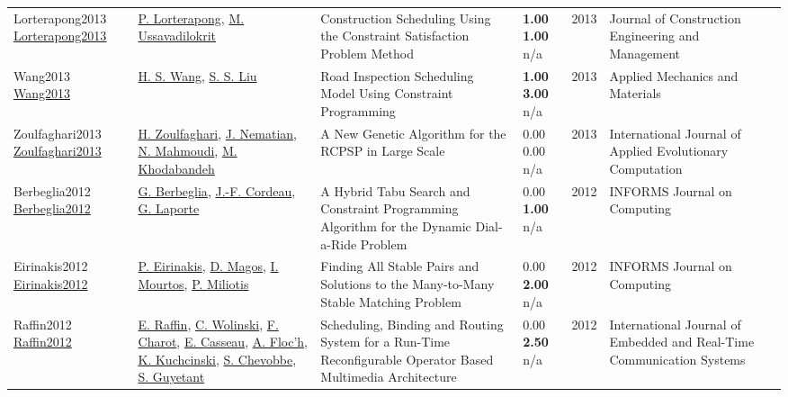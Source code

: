 {\begin{longtable}{p{3cm}p{5cm}p{10cm}p{1cm}rp{2.5cm}l}
Lorterapong2013 \href{http://dx.doi.org/10.1061/(asce)co.1943-7862.0000582}{Lorterapong2013} & \hyperref[auth:a1789]{P. Lorterapong}, \hyperref[auth:a1790]{M. Ussavadilokrit} & Construction Scheduling Using the Constraint Satisfaction Problem Method & \noindent{}\textbf{1.00} \textbf{1.00} n/a & 2013 & Journal of Construction Engineering and Management & \cite{Lorterapong2013}\\
Wang2013 \href{http://dx.doi.org/10.4028/www.scientific.net/amm.357-360.2720}{Wang2013} & \hyperref[auth:a1900]{H. S. Wang}, \hyperref[auth:a1901]{S. S. Liu} & Road Inspection Scheduling Model Using Constraint Programming & \noindent{}\textbf{1.00} \textbf{3.00} n/a & 2013 & Applied Mechanics and Materials & \cite{Wang2013}\\
Zoulfaghari2013 \href{http://dx.doi.org/10.4018/jaec.2013040103}{Zoulfaghari2013} & \hyperref[auth:a1755]{H. Zoulfaghari}, \hyperref[auth:a1756]{J. Nematian}, \hyperref[auth:a1757]{N. Mahmoudi}, \hyperref[auth:a1758]{M. Khodabandeh} & A New Genetic Algorithm for the RCPSP in Large Scale & \noindent{}\textcolor{black!50}{0.00} \textcolor{black!50}{0.00} n/a & 2013 & International Journal of Applied Evolutionary Computation & \cite{Zoulfaghari2013}\\
Berbeglia2012 \href{http://dx.doi.org/10.1287/ijoc.1110.0454}{Berbeglia2012} & \hyperref[auth:a1844]{G. Berbeglia}, \hyperref[auth:a1845]{J.-F. Cordeau}, \hyperref[auth:a1073]{G. Laporte} & A Hybrid Tabu Search and Constraint Programming Algorithm for the Dynamic Dial-a-Ride Problem & \noindent{}\textcolor{black!50}{0.00} \textbf{1.00} n/a & 2012 & \cellcolor{red!20}INFORMS Journal on Computing & \cite{Berbeglia2012}\\
Eirinakis2012 \href{http://dx.doi.org/10.1287/ijoc.1110.0449}{Eirinakis2012} & \hyperref[auth:a1913]{P. Eirinakis}, \hyperref[auth:a1914]{D. Magos}, \hyperref[auth:a1915]{I. Mourtos}, \hyperref[auth:a1916]{P. Miliotis} & Finding All Stable Pairs and Solutions to the Many-to-Many Stable Matching Problem & \noindent{}\textcolor{black!50}{0.00} \textbf{2.00} n/a & 2012 & \cellcolor{red!20}INFORMS Journal on Computing & \cite{Eirinakis2012}\\
Raffin2012 \href{http://dx.doi.org/10.4018/jertcs.2012010101}{Raffin2012} & \hyperref[auth:a1529]{E. Raffin}, \hyperref[auth:a658]{C. Wolinski}, \hyperref[auth:a1530]{F. Charot}, \hyperref[auth:a1531]{E. Casseau}, \hyperref[auth:a1532]{A. Floc’h}, \hyperref[auth:a659]{K. Kuchcinski}, \hyperref[auth:a1533]{S. Chevobbe}, \hyperref[auth:a1534]{S. Guyetant} & \cellcolor{green!10}Scheduling, Binding and Routing System for a Run-Time Reconfigurable Operator Based Multimedia Architecture & \noindent{}\textcolor{black!50}{0.00} \textbf{2.50} n/a & 2012 & International Journal of Embedded and Real-Time Communication Systems & \cite{Raffin2012}\\

\end{longtable}}
